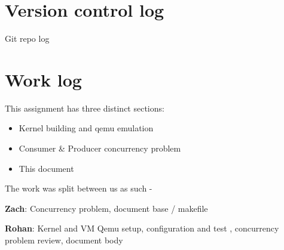 \documentclass[letterpaper,10pt,fleqn]{article}
\begin{document}
	\section*{Version control log}
	Git repo log

	\section*{Work log}
	This assignment has three distinct sections:
	\begin{itemize}
		\item Kernel building and qemu emulation
		\item Consumer \& Producer concurrency problem
		\item This document
	\end{itemize}
	The work was split between us as such -

	\textbf{Zach}: Concurrency problem, document base / makefile

	\textbf{Rohan}: Kernel and VM Qemu setup, configuration and test , concurrency problem review, document body
\end{document}

